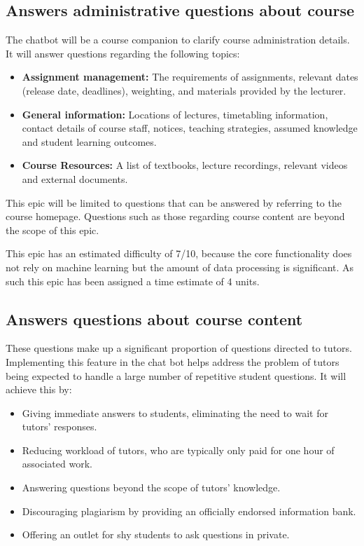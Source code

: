 \documentclass{article}
\begin{document}
\subsection{Answers administrative questions about course}

The chatbot will be a course companion to clarify course administration details. It will answer questions regarding the following topics:
\begin{itemize}
  \item \textbf{Assignment management:} The requirements of assignments, relevant dates (release date, deadlines), weighting, and materials provided by the lecturer.
  \item \textbf{General information:} Locations of lectures, timetabling information, contact details of course staff, notices, teaching strategies, assumed knowledge and student learning outcomes.
  \item \textbf{Course Resources:} A list of textbooks, lecture recordings, relevant videos and external documents. 
\end{itemize}

This epic will be limited to questions that can be answered by referring to the course homepage. Questions such as those regarding course content are beyond the scope of this epic.

This epic has an estimated difficulty of 7/10, because the core functionality does not rely on machine learning but the amount of data processing is significant. As such this epic has been assigned a time estimate of 4 units. 

\subsection{Answers questions about course content}
These questions make up a significant proportion of questions directed to tutors. Implementing this feature in the chat bot helps address the problem of tutors being expected to handle a large number of repetitive student questions. It will achieve this by:
\begin{itemize}
  \item Giving immediate answers to students, eliminating the need to wait for tutors' responses.
  \item Reducing workload of tutors, who are typically only paid for one hour of associated work.
  \item Answering questions beyond the scope of tutors' knowledge.
  \item Discouraging plagiarism by providing an officially endorsed information bank.
  \item Offering an outlet for shy students to ask questions in private.
\end{itemize}
\end{document}
